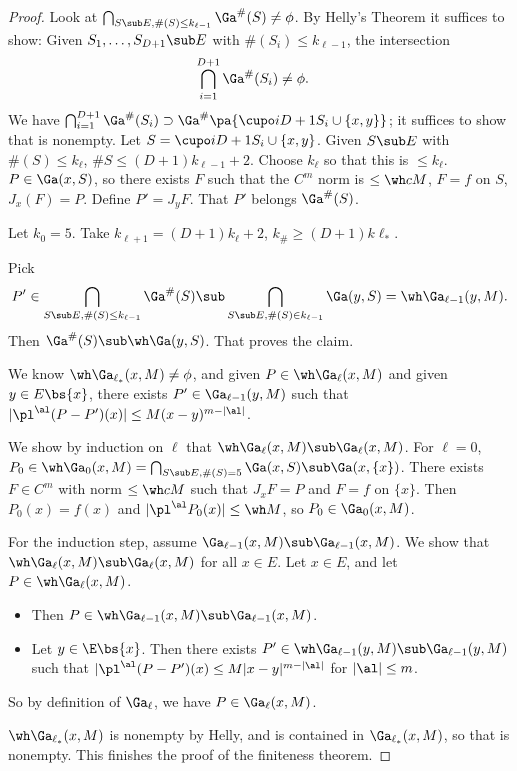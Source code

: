 \begin{proof}
Look at $\bigcap_{S\sub E, \#(S)\le k_{\ell-1}}\Ga^\#(S)\ne \phi$. By Helly's Theorem it suffices to show: Given $S_1,\ldots, S_{D+1}\sub E$ with $\#(S_i)\le k_{\ell-1}$, the intersection
\begin{align}
\bigcap_{i=1}^{D+1}\Ga^\#(S_i) &\ne \phi.
\end{align}
We have $\bigcap_{i=1}^{D+1}\Ga^\#(S_i) \supset \Ga^\# \pa{\cupo i{D+1}S_i\cup \{x,y\}}$; it suffices to show that is nonempty. Let $S=\cupo i{D+1}S_i\cup \{x,y\}$.
Given $S\sub E$ with $\#(S)\le k_\ell$, 
$\#S \le (D+1)k_{\ell-1}+2$. Choose $k_\ell$ so that this is $\le k_\ell$.
$P\in \Ga(x,S)$, %
so there exists $F$ such that the $C^m$ norm is $\le \wh cM$, $F=f$ on $S$, $J_x(F)=P$. Define $P'=J_yF$.  That $P'$ belongs $\Ga^\#(S)$. 

Let $k_0=5$. Take $k_{\ell+1} = (D+1)k_\ell + 2$, $k_\#\ge (D+1)k \ell_*$. 

Pick 
\begin{align}
P'\in \bigcap_{S\sub E, \#(S)\le k_{\ell-1}} \Ga^\#(S) \sub \bigcap_{S\sub E, \#(S)\in k_{\ell-1}} \Ga(y,S) =\wh\Ga_{\ell-1}(y,M).
\end{align}
Then $\Ga^\#(S)\sub \wh \Ga(y,S)$. %
That proves the claim. %

We know $\wh \Ga_{\ell_*}(x,M)\ne \phi$, and given $P\in \wh \Ga_\ell(x,M)$ and given $y\in E\bs \{x\}$, there exists $P'\in \Ga_{\ell-1}(y,M)$ such that $|\pl^\al(P-P')(x)|\le M(x-y)^{m-|\al|}$. 

We show by induction on $\ell$ that $\wh \Ga_\ell(x,M)\sub \Ga_\ell(x,M)$. For $\ell=0$, $P_0\in \wh \Ga_0(x,M) = \bigcap_{S\sub E, \#(S)=5}\Ga(x,S) \sub \Ga(x,\{x\})$. There exists $F\in C^m$ with norm $\le \wh c M$ such that $J_xF=P$ and $F=f$ on $\{x\}$. Then $P_0(x)=f(x)$ and $|\pl^\al P_0(x)|\le \wh M$, so $P_0\in\Ga_0(x,M)$. 

For the induction step, assume $\Ga_{\ell-1}(x,M)\sub \Ga_{\ell-1}(x,M)$. We show that $\wh \Ga_\ell(x,M)\sub \Ga_\ell(x,M)$ for all $x\in E$. Let $x\in E$, and let $P\in \wh \Ga_\ell(x,M)$. 
\begin{itemize}
\item
Then $P\in \wh \Ga_{\ell-1}(x,M)\sub \Ga_{\ell-1}(x,M)$. 
\item 
Let $y\in \E\bs \{x\}$. Then there exists $P'\in\wh  \Ga_{\ell-1}(y,M)\sub \Ga_{\ell-1}(y,M)$ such that $|\pl^\al(P-P')(x)\le M|x-y|^{m-|\al|}$ for $|\al|\le m$. 
\end{itemize}
So by definition of $\Ga_\ell$, we have $P\in \Ga_\ell(x,M)$. 

$\wh \Ga_{\ell_*}(x,M)$ is nonempty by Helly, and is contained in $\Ga_{\ell_*}(x,M)$, so that is nonempty. %
This finishes the proof of the finiteness theorem.
\end{proof}

